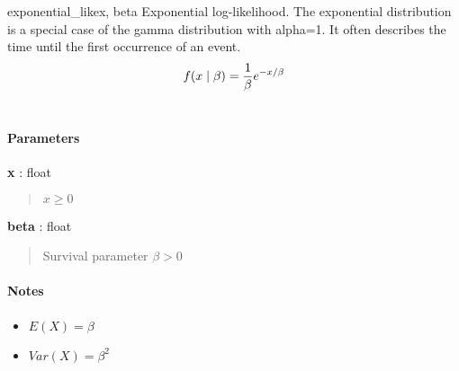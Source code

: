 \hypertarget{pymc.distributions.exponential_like}{}
\begin{funcdesc}{exponential\_like}{x, beta}
Exponential log-likelihood. The exponential distribution is a special case of the gamma distribution
with alpha=1. It often describes the time until the first occurrence of an event.
\begin{gather}
\begin{split}f(x \mid \beta) = \frac{1}{\beta}e^{-x/\beta}\end{split}\notag\\\begin{split}\end{split}\notag
\end{gather}
\paragraph{Parameters}
\begin{paramlist}
\item[] \textbf{x} : float
\begin{quote}

$x \ge 0$
\end{quote}

\item[] \textbf{beta} : float
\begin{quote}

Survival parameter $\beta > 0$
\end{quote}
\end{paramlist}
\paragraph{Notes}
\begin{itemize}
\item {}
$E(X) = \beta$

\item {}
$Var(X) = \beta^2$

\end{itemize}
\end{funcdesc}

